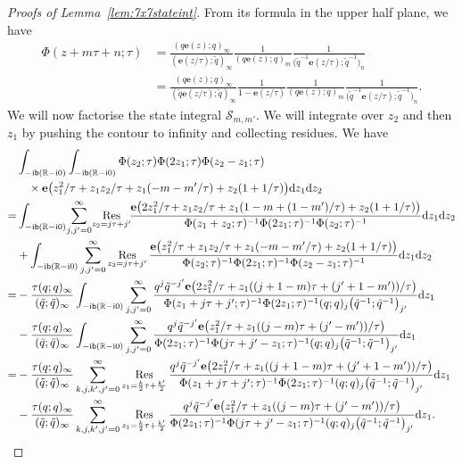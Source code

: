 \documentclass[pdftex]{sigma}
\numberwithin{equation}{section}
\def\BR{\mathbb{R}}
\def\tq{\tilde{q}}
\def\Res{\mathrm{Res}}
\def\e{\mathbf e}
\def\BR{\mathbb R}
\def\calS{\mathcal S}
\def\tq{\tilde{q}}
\def\Res{\mathrm{Res}}
\begin{document}
\begin{proof}[Proofs of Lemma~\ref{lem:7x7stateint}]
From its formula in the upper half plane, we have
\begin{align*}
 \Phi(z+m\tau+n;\tau)
 & =
 \frac{(q\e(z);q)_{\infty}}{(\e(z/\tau);\tq)_{\infty}}\frac{1}{(q\e(z);q)_{m}}\frac{1}{\bigl(\tq^{-1}\e(z/\tau);\tq^{-1}\bigr)_{n}}\\
 & =
 \frac{(q\e(z);q)_{\infty}}{(\tq\e(z/\tau);\tq)_{\infty}}\frac{1}{1-\e(z/\tau)}\frac{1}{(q\e(z);q)_{m}}\frac{1}{\bigl(\tq^{-1}\e(z/\tau);\tq^{-1}\bigr)_{n}}.
\end{align*}
We will now factorise the state integral $\calS_{m,m'}$.
We will integrate over $z_2$ and then $z_1$ by pushing the contour to infinity and collecting residues. We have
\begin{align}
 &\int_{-{\rm i}\mathsf{b}(\BR-{\rm i}0)}\int_{-{\rm i}\mathsf{b}(\BR-{\rm i}0)}\Phi(z_2;\tau)\Phi(2z_1;\tau)\Phi(z_2-z_1;\tau)\nonumber\\
 &\quad\times
 \e\bigl(z_1^2/\tau+z_1z_2/\tau+z_1(-m-m'/\tau)+z_2(1+1/\tau)\bigr){\rm d}z_1{\rm d}z_2
  \nonumber\\
  =&
 \int_{-{\rm i}\mathsf{b}(\BR-{\rm i}0)}\! \sum_{j,j'=0}^{\infty}\!\mathop{\Res}\limits_{z_2=j\tau+j'}\!\!
 \frac{\e\bigl(2z_1^2/\tau\!+z_1z_2/\tau+z_1(1-m+(1-m')/\tau)+z_2(1+1/\tau)\bigr)} {\Phi(z_1+z_2;\tau)^{-1}\Phi(2z_1;\tau)^{-1}\Phi(z_2;\tau)^{-1}}{\rm d}z_1{\rm d}z_2
  \nonumber\\
 &+
 \int_{-{\rm i}\mathsf{b}(\BR-{\rm i}0)}\sum_{j,j'=0}^{\infty}\mathop{\Res}\limits_{z_2=j\tau+j'}
 \frac{\e\bigl(z_1^2/\tau+z_1z_2/\tau+z_1(-m-m'/\tau)+z_2(1+1/\tau)\bigr)}{\Phi(z_2;\tau)^{-1}\Phi(2z_1;\tau)^{-1}\Phi(z_2-z_1;\tau)^{-1}}{\rm d}z_1{\rm d}z_2
  \nonumber\\
  =
 &-\frac{\tau(q;q)_{\infty}}{(\tq;\tq)_{\infty}}\int_{-{\rm i}\mathsf{b}(\BR-{\rm i}0)}\sum_{j,j'=0}^{\infty} \frac{q^{j}\tq^{-j'}\e\bigl(2z_1^2/\tau+z_1((j+1-m)\tau+(j'+1-m'))/\tau\bigr)}{\Phi(z_1+j\tau+j';\tau)^{-1}\Phi(2z_1;\tau)^{-1}(q;q)_{j} \bigl(\tq^{-1};\tq^{-1}\bigr)_{j'}}{\rm d}z_1
  \nonumber\\
 &
 -\frac{\tau(q;q)_{\infty}}{(\tq;\tq)_{\infty}}\int_{-{\rm i}\mathsf{b}(\BR-{\rm i}0)}\sum_{j,j'=0}^{\infty} \frac{q^{j}\tq^{-j'}\e\bigl(z_1^2/\tau+z_1((j-m)\tau+(j'-m'))/\tau\bigr)}{\Phi(2z_1;\tau)^{-1}\Phi(j\tau+j'-z_1;\tau)^{-1}(q;q)_{j} \bigl(\tq^{-1};\tq^{-1}\bigr)_{j'}}{\rm d}z_1
\label{eq:fac.equ}\\
  =
 &-\frac{\tau(q;q)_{\infty}}{(\tq;\tq)_{\infty}}\sum_{k,j,k',j'=0}^{\infty}\mathop{\Res}\limits_{z_1=\frac{k}{2}\tau+\frac{k'}{2}}
 \frac{q^{j}\tq^{-j'}\e\bigl(2z_1^2/\tau+z_1((j+1-m)\tau+(j'+1-m'))/\tau\bigr)} {\Phi(z_1+j\tau+j';\tau)^{-1}\Phi(2z_1;\tau)^{-1}(q;q)_{j}\bigl(\tq^{-1};\tq^{-1}\bigr)_{j'}}{\rm d}z_1
 \nonumber\\
 &
 -\frac{\tau(q;q)_{\infty}}{(\tq;\tq)_{\infty}}\sum_{k,j,k',j'=0}^{\infty}\mathop{\Res}\limits_{z_1=\frac{k}{2}\tau+\frac{k'}{2}}
 \frac{q^{j}\tq^{-j'}\e\bigl(z_1^2/\tau+z_1((j-m)\tau+(j'-m'))/\tau\bigr)}{\Phi(2z_1;\tau)^{-1}\Phi(j\tau+j'-z_1;\tau)^{-1}(q;q)_{j} \bigl(\tq^{-1};\tq^{-1}\bigr)_{j'}}{\rm d}z_1.
 \nonumber
\end{align}


\end{proof}
\end{document}
